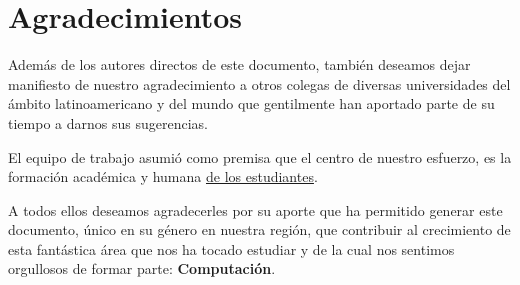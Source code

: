 \chapter*{Agradecimientos}\label{chap:cs-ack}
%

Además de los autores directos de este documento, también deseamos dejar manifiesto de nuestro 
agradecimiento a otros colegas de diversas universidades del ámbito latinoamericano  y del mundo que gentilmente han aportado parte de su tiempo a darnos sus sugerencias.


El equipo de trabajo asumió como premisa que el centro de nuestro esfuerzo,
es la formación académica y humana \underline{de los estudiantes}.

A todos ellos deseamos agradecerles por su aporte que ha permitido generar 
este documento, único en su género en nuestra región, que contribuir al crecimiento de
esta fantástica área que nos ha tocado estudiar y
de la cual nos sentimos orgullosos de formar parte: \textbf{Computación}.
